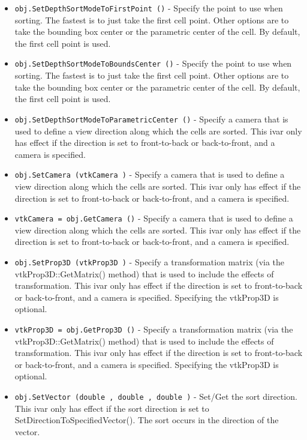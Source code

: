 \begin{itemize}
\item  \verb|obj.SetDepthSortModeToFirstPoint ()| -  Specify the point to use when sorting. The fastest is to just
 take the first cell point. Other options are to take the bounding
 box center or the parametric center of the cell. By default, the
 first cell point is used.

\item  \verb|obj.SetDepthSortModeToBoundsCenter ()| -  Specify the point to use when sorting. The fastest is to just
 take the first cell point. Other options are to take the bounding
 box center or the parametric center of the cell. By default, the
 first cell point is used.

\item  \verb|obj.SetDepthSortModeToParametricCenter ()| -  Specify a camera that is used to define a view direction along which
 the cells are sorted. This ivar only has effect if the direction is set
 to front-to-back or back-to-front, and a camera is specified.

\item  \verb|obj.SetCamera (vtkCamera )| -  Specify a camera that is used to define a view direction along which
 the cells are sorted. This ivar only has effect if the direction is set
 to front-to-back or back-to-front, and a camera is specified.

\item  \verb|vtkCamera = obj.GetCamera ()| -  Specify a camera that is used to define a view direction along which
 the cells are sorted. This ivar only has effect if the direction is set
 to front-to-back or back-to-front, and a camera is specified.

\item  \verb|obj.SetProp3D (vtkProp3D )| -  Specify a transformation matrix (via the vtkProp3D::GetMatrix() method)
 that is used to include the effects of transformation. This ivar only
 has effect if the direction is set to front-to-back or back-to-front,
 and a camera is specified. Specifying the vtkProp3D is optional.

\item  \verb|vtkProp3D = obj.GetProp3D ()| -  Specify a transformation matrix (via the vtkProp3D::GetMatrix() method)
 that is used to include the effects of transformation. This ivar only
 has effect if the direction is set to front-to-back or back-to-front,
 and a camera is specified. Specifying the vtkProp3D is optional.

\item  \verb|obj.SetVector (double , double , double )| -  Set/Get the sort direction. This ivar only has effect if the sort
 direction is set to SetDirectionToSpecifiedVector(). The sort occurs
 in the direction of the vector.


\end{itemize}
